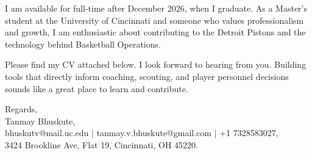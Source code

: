 \documentclass[11pt]{letter}
\begin{document}
\begin{letter}{}
I am available for full-time after December 2026, when I graduate. As a Master's student at the University of Cincinnati and someone who values professionalism and growth, I am enthusiastic about contributing to the Detroit Pistons and the technology behind Basketball Operations.

Please find my CV attached below. I look forward to hearing from you. Building tools that directly inform coaching, scouting, and player personnel decisions sounds like a great place to learn and contribute.

{\setlength{\parskip}{0pt}
Regards,\\
Tanmay Bhuskute,\\
bhuskutv@mail.uc.edu $\mid$ tanmay.v.bhuskute@gmail.com $\mid$ +1 7328583027,\\
3424 Brookline Ave, Flat 19, Cincinnati, OH 45220.
}

\end{letter}
\end{document}
